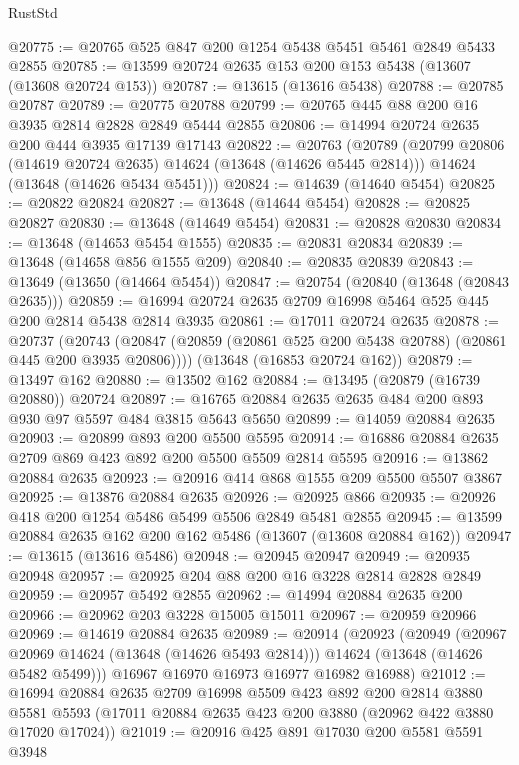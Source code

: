 \begin{lexlean}{RustStd}
\begin{coremodule}
@20775 := @20765 @525 @847 @200 @1254 @5438 @5451 @5461 @2849 @5433 @2855
@20785 := @13599 @20724 @2635 @153 @200 @153 @5438 (@13607 (@13608 @20724 @153))
@20787 := @13615 (@13616 @5438)
@20788 := @20785 @20787
@20789 := @20775 @20788
@20799 := @20765 @445 @88 @200 @16 @3935 @2814 @2828 @2849 @5444 @2855
@20806 := @14994 @20724 @2635 @200 @444 @3935 @17139 @17143
@20822 := @20763
    (@20789
      (@20799 @20806 (@14619 @20724 @2635) @14624 (@13648 (@14626 @5445 @2814)))
      @14624
      (@13648 (@14626 @5434 @5451)))
@20824 := @14639 (@14640 @5454)
@20825 := @20822 @20824
@20827 := @13648 (@14644 @5454)
@20828 := @20825 @20827
@20830 := @13648 (@14649 @5454)
@20831 := @20828 @20830
@20834 := @13648 (@14653 @5454 @1555)
@20835 := @20831 @20834
@20839 := @13648 (@14658 @856 @1555 @209)
@20840 := @20835 @20839
@20843 := @13649 (@13650 (@14664 @5454))
@20847 := @20754 (@20840 (@13648 (@20843 @2635)))
@20859 := @16994 @20724 @2635 @2709 @16998 @5464 @525 @445 @200 @2814 @5438 @2814 @3935
@20861 := @17011 @20724 @2635
@20878 := @20737
    (@20743 (@20847 (@20859 (@20861 @525 @200 @5438 @20788) (@20861 @445 @200 @3935 @20806))))
    (@13648 (@16853 @20724 @162))
@20879 := @13497 @162
@20880 := @13502 @162
@20884 := @13495 (@20879 (@16739 @20880)) @20724
@20897 := @16765 @20884 @2635 @2635 @484 @200 @893 @930 @97 @5597 @484 @3815 @5643 @5650
@20899 := @14059 @20884 @2635
@20903 := @20899 @893 @200 @5500 @5595
@20914 := @16886 @20884 @2635 @2709 @869 @423 @892 @200 @5500 @5509 @2814 @5595
@20916 := @13862 @20884 @2635
@20923 := @20916 @414 @868 @1555 @209 @5500 @5507 @3867
@20925 := @13876 @20884 @2635
@20926 := @20925 @866
@20935 := @20926 @418 @200 @1254 @5486 @5499 @5506 @2849 @5481 @2855
@20945 := @13599 @20884 @2635 @162 @200 @162 @5486 (@13607 (@13608 @20884 @162))
@20947 := @13615 (@13616 @5486)
@20948 := @20945 @20947
@20949 := @20935 @20948
@20957 := @20925 @204 @88 @200 @16 @3228 @2814 @2828 @2849
@20959 := @20957 @5492 @2855
@20962 := @14994 @20884 @2635 @200
@20966 := @20962 @203 @3228 @15005 @15011
@20967 := @20959 @20966
@20969 := @14619 @20884 @2635
@20989 := @20914
    (@20923
      (@20949
        (@20967 @20969 @14624 (@13648 (@14626 @5493 @2814)))
        @14624
        (@13648 (@14626 @5482 @5499)))
      @16967
      @16970
      @16973
      @16977
      @16982
      @16988)
@21012 := @16994
    @20884
    @2635
    @2709
    @16998
    @5509
    @423
    @892
    @200
    @2814
    @3880
    @5581
    @5593
    (@17011 @20884 @2635 @423 @200 @3880 (@20962 @422 @3880 @17020 @17024))
@21019 := @20916 @425 @891 @17030 @200 @5581 @5591 @3948

\end{coremodule}
\end{lexlean}
